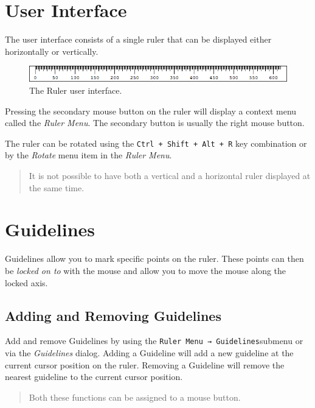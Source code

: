 \documentclass[
]{book}
\begin{document}
\hypertarget{ui}{%
\chapter{User Interface}\label{ui}}

The user interface consists of a single ruler that can be displayed either horizontally or vertically.

\begin{figure}
\includegraphics[width=1\linewidth]{images/ruler} \caption{The Ruler user interface.}\label{fig:unnamed-chunk-1}
\end{figure}

Pressing the secondary mouse button on the ruler will display a context menu called the \emph{Ruler Menu}.
The secondary button is usually the right mouse button.

The ruler can be rotated using the \texttt{Ctrl\ +\ Shift\ +\ Alt\ +\ R} key combination or by the \emph{Rotate} menu item in the \emph{Ruler Menu}.

\begin{quote}
It is not possible to have both a vertical and a horizontal ruler displayed at the same time.
\end{quote}

\hypertarget{guidelines}{%
\chapter{Guidelines}\label{guidelines}}

Guidelines allow you to mark specific points on the ruler.
These points can then be \emph{locked on to} with the mouse and allow you to move the mouse along the locked axis.

\hypertarget{adding-and-removing-guidelines}{%
\section{Adding and Removing Guidelines}\label{adding-and-removing-guidelines}}

Add and remove Guidelines by using the \texttt{Ruler\ Menu\ →\ Guidelines}submenu or via the \emph{Guidelines} dialog.
Adding a Guideline will add a new guideline at the current cursor position on the ruler.
Removing a Guideline will remove the nearest guideline to the current cursor position.

\begin{quote}
Both these functions can be assigned to a mouse button.
\end{quote}
\end{document}
